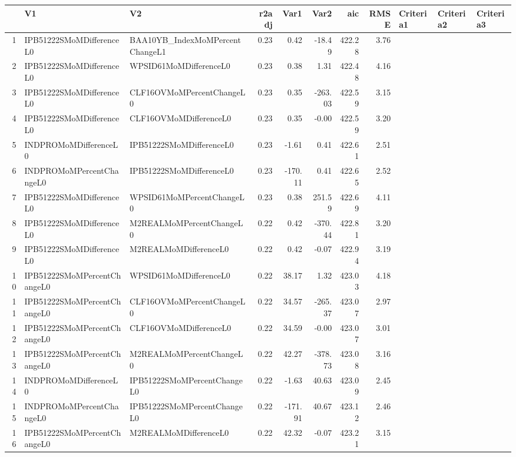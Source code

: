 \begin{longtable}{rllrrrrrlll}
  \hline
 & V1 & V2 & r2adj & Var1 & Var2 & aic & RMSE & Criteria1 & Criteria2 & Criteria3 \\ 
  \hline
1 & IPB51222SMoMDifferenceL0 & BAA10YB\_IndexMoMPercentChangeL1 & 0.23 & 0.42 & -18.49 & 422.28 & 3.76 &  &  &  \\ 
  2 & IPB51222SMoMDifferenceL0 & WPSID61MoMDifferenceL0 & 0.23 & 0.38 & 1.31 & 422.48 & 4.16 &  &  &  \\ 
  3 & IPB51222SMoMDifferenceL0 & CLF16OVMoMPercentChangeL0 & 0.23 & 0.35 & -263.03 & 422.59 & 3.15 &  &  &  \\ 
  4 & IPB51222SMoMDifferenceL0 & CLF16OVMoMDifferenceL0 & 0.23 & 0.35 & -0.00 & 422.59 & 3.20 &  &  &  \\ 
  5 & INDPROMoMDifferenceL0 & IPB51222SMoMDifferenceL0 & 0.23 & -1.61 & 0.41 & 422.61 & 2.51 &  &  &  \\ 
  6 & INDPROMoMPercentChangeL0 & IPB51222SMoMDifferenceL0 & 0.23 & -170.11 & 0.41 & 422.65 & 2.52 &  &  &  \\ 
  7 & IPB51222SMoMDifferenceL0 & WPSID61MoMPercentChangeL0 & 0.23 & 0.38 & 251.59 & 422.69 & 4.11 &  &  &  \\ 
  8 & IPB51222SMoMDifferenceL0 & M2REALMoMPercentChangeL0 & 0.22 & 0.42 & -370.44 & 422.81 & 3.20 &  &  &  \\ 
  9 & IPB51222SMoMDifferenceL0 & M2REALMoMDifferenceL0 & 0.22 & 0.42 & -0.07 & 422.94 & 3.19 &  &  &  \\ 
  10 & IPB51222SMoMPercentChangeL0 & WPSID61MoMDifferenceL0 & 0.22 & 38.17 & 1.32 & 423.03 & 4.18 &  &  &  \\ 
  11 & IPB51222SMoMPercentChangeL0 & CLF16OVMoMPercentChangeL0 & 0.22 & 34.57 & -265.37 & 423.07 & 2.97 &  &  &  \\ 
  12 & IPB51222SMoMPercentChangeL0 & CLF16OVMoMDifferenceL0 & 0.22 & 34.59 & -0.00 & 423.07 & 3.01 &  &  &  \\ 
  13 & IPB51222SMoMPercentChangeL0 & M2REALMoMPercentChangeL0 & 0.22 & 42.27 & -378.73 & 423.08 & 3.16 &  &  &  \\ 
  14 & INDPROMoMDifferenceL0 & IPB51222SMoMPercentChangeL0 & 0.22 & -1.63 & 40.63 & 423.09 & 2.45 &  &  &  \\ 
  15 & INDPROMoMPercentChangeL0 & IPB51222SMoMPercentChangeL0 & 0.22 & -171.91 & 40.67 & 423.12 & 2.46 &  &  &  \\ 
  16 & IPB51222SMoMPercentChangeL0 & M2REALMoMDifferenceL0 & 0.22 & 42.32 & -0.07 & 423.21 & 3.15 &  &  &  \\ 

\end{longtable}
